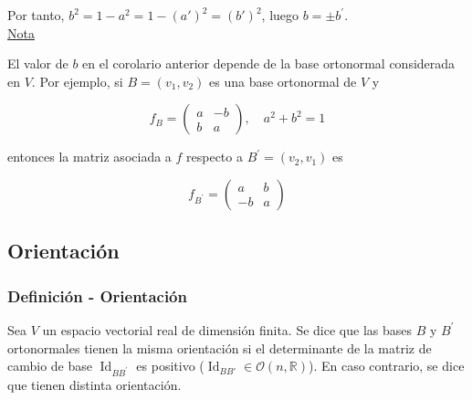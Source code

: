 \documentclass[12pt, a4paper, ones, notitlepage, openany,titlepage]{article}
\begin{document}
\noindent Por tanto, $b^{2}=1-a^{2}=1-(a')^2=(b')^{2}$, luego $b= \pm b^{\prime}$.\\

\noindent\underline{Nota}

El valor de $b$ en el corolario anterior depende de la base ortonormal considerada en $V$. Por ejemplo, si $B=\left(v_{1}, v_{2}\right)$ es una base ortonormal de $V$ y

$$
f_{B}=\left(\begin{array}{rr}
	a & -b \\
	b & a
\end{array}\right), \quad a^{2}+b^{2}=1
$$

entonces la matriz asociada a $f$ respecto a $B^{\prime}=\left(v_{2}, v_{1}\right)$ es

$$
f_{B^{\prime}}=\left(\begin{array}{rr}
	a & b \\
	-b & a
\end{array}\right)
$$

\subsection{Orientación}

\subsubsection{Definición - Orientación}
Sea $V$ un espacio vectorial real de dimensión finita. Se dice que las bases $B$ y $B^{\prime}$ ortonormales tienen la misma orientación si el determinante de la matriz de cambio de base $\operatorname{Id}_{BB^{\prime}}$ es positivo ($\operatorname{Id}_{BB'} \in \mathcal{O}(n,\mathbb{R})$). En caso contrario, se dice que tienen distinta orientación.
\end{document}
